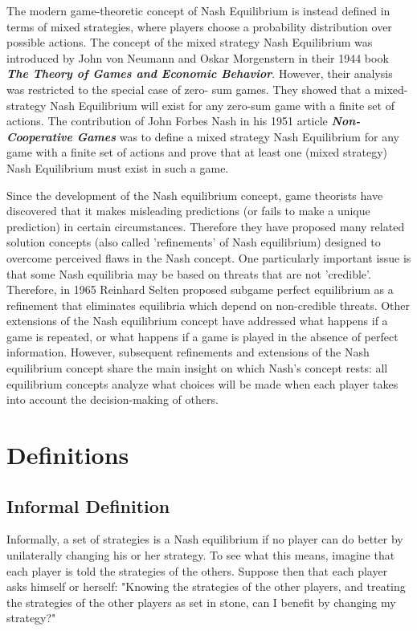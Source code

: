 \documentclass[twocolumn]{article}
\begin{document}
The modern game-theoretic concept of Nash Equilibrium is instead defined in terms of mixed strategies, where players choose a probability distribution over possible actions. The concept of the mixed strategy Nash Equilibrium was introduced by John von Neumann and Oskar Morgenstern in their 1944 book \emph{\bfseries The Theory of Games and Economic Behavior}. However, their analysis was restricted to the special case of zero- sum games. They showed that a mixed-strategy Nash Equilibrium will exist for any zero-sum game with a finite set of actions. The contribution of John Forbes Nash in his 1951 article \emph{\bfseries Non-Cooperative Games} was to define a mixed strategy Nash Equilibrium for any game with a finite set of actions and prove that at least one (mixed strategy) Nash Equilibrium must exist in such a game.

Since the development of the Nash equilibrium concept, game theorists have discovered that it makes misleading predictions (or fails to make a unique prediction) in certain circumstances. Therefore they have proposed many related solution concepts (also called 'refinements' of Nash equilibrium) designed to overcome perceived flaws in the Nash concept. One particularly important issue is that some Nash equilibria may be based on threats that are not 'credible'. Therefore, in 1965 Reinhard Selten proposed subgame perfect equilibrium as a refinement that eliminates equilibria which depend on non-credible threats. Other extensions of the Nash equilibrium concept have addressed what happens if a game is repeated, or what happens if a game is played in the absence of perfect information. However, subsequent refinements and extensions of the Nash equilibrium concept share the main insight on which Nash's concept rests: all equilibrium concepts analyze what choices will be made when each player takes into account the decision-making of others.

\section{Definitions}
\subsection{Informal Definition}
Informally, a set of strategies is a Nash equilibrium if no player can do better by unilaterally changing his or her strategy. To see what this means, imagine that each player is told the strategies of the others. Suppose then that each player asks himself or herself: "Knowing the strategies of the other players, and treating the strategies of the other players as set in stone, can I benefit by changing my strategy?"
\end{document}
